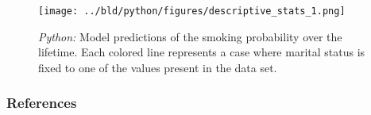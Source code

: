 \documentclass[11pt, aspectratio=169]{beamer}
\begin{document}
\begin{frame}[t]
    \begin{figure}[H]

        \centering
        \texttt{[image: ../bld/python/figures/descriptive\_stats\_1.png]}

        \caption{\emph{Python:} Model predictions of the smoking probability over the
            lifetime. Each colored line represents a case where marital status is fixed to
            one of the values present in the data set.}
\label{fig:python-predictions}

    \end{figure}
\end{frame}






 {
    \begin{frame}
        \frametitle{}
    \end{frame}

}

\begin{frame}[allowframebreaks]
    \frametitle{References}
    \renewcommand{\bibfont}{\normalfont\footnotesize}
    \printbibliography
\end{frame}
\end{document}
